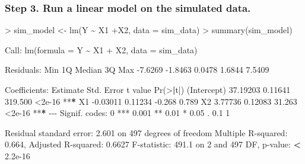 \documentclass[
]{article}
\newenvironment{Shaded}{\begin{snugshade}}{\end{snugshade}}
\newcommand{\AttributeTok}[1]{\textcolor[rgb]{0.77,0.63,0.00}{#1}}
\newcommand{\DecValTok}[1]{\textcolor[rgb]{0.00,0.00,0.81}{#1}}
\newcommand{\ErrorTok}[1]{\textcolor[rgb]{0.64,0.00,0.00}{\textbf{#1}}}
\newcommand{\FloatTok}[1]{\textcolor[rgb]{0.00,0.00,0.81}{#1}}
\newcommand{\FunctionTok}[1]{\textcolor[rgb]{0.00,0.00,0.00}{#1}}
\newcommand{\NormalTok}[1]{#1}
\newcommand{\OtherTok}[1]{\textcolor[rgb]{0.56,0.35,0.01}{#1}}
\newcommand{\SpecialCharTok}[1]{\textcolor[rgb]{0.00,0.00,0.00}{#1}}
\newcommand{\StringTok}[1]{\textcolor[rgb]{0.31,0.60,0.02}{#1}}
\begin{document}
\hypertarget{step-3.-run-a-linear-model-on-the-simulated-data.}{%
\subsubsection{Step 3. Run a linear model on the simulated
data.}\label{step-3.-run-a-linear-model-on-the-simulated-data.}}

\begin{Shaded}
\begin{Highlighting}[]
\SpecialCharTok{\textgreater{}}\NormalTok{ sim\_model }\OtherTok{\textless{}{-}} \FunctionTok{lm}\NormalTok{(Y }\SpecialCharTok{\textasciitilde{}}\NormalTok{ X1 }\SpecialCharTok{+}\NormalTok{X2, }\AttributeTok{data =}\NormalTok{ sim\_data)}
\SpecialCharTok{\textgreater{}} \FunctionTok{summary}\NormalTok{(sim\_model)}

\NormalTok{Call}\SpecialCharTok{:}
\FunctionTok{lm}\NormalTok{(}\AttributeTok{formula =}\NormalTok{ Y }\SpecialCharTok{\textasciitilde{}}\NormalTok{ X1 }\SpecialCharTok{+}\NormalTok{ X2, }\AttributeTok{data =}\NormalTok{ sim\_data)}

\NormalTok{Residuals}\SpecialCharTok{:}
\NormalTok{    Min      1Q  Median      3Q     Max }
\SpecialCharTok{{-}}\FloatTok{7.6269} \SpecialCharTok{{-}}\FloatTok{1.8463}  \FloatTok{0.0478}  \FloatTok{1.6844}  \FloatTok{7.5409} 

\NormalTok{Coefficients}\SpecialCharTok{:}
\NormalTok{            Estimate Std. Error t value }\FunctionTok{Pr}\NormalTok{(}\SpecialCharTok{\textgreater{}}\ErrorTok{|}\NormalTok{t}\SpecialCharTok{|}\NormalTok{)    }
\NormalTok{(Intercept) }\FloatTok{37.19203}    \FloatTok{0.11641} \FloatTok{319.500}   \SpecialCharTok{\textless{}}\FloatTok{2e{-}16} \SpecialCharTok{**}\ErrorTok{*}
\NormalTok{X1          }\SpecialCharTok{{-}}\FloatTok{0.03011}    \FloatTok{0.11234}  \SpecialCharTok{{-}}\FloatTok{0.268}    \FloatTok{0.789}    
\NormalTok{X2           }\FloatTok{3.77736}    \FloatTok{0.12083}  \FloatTok{31.263}   \SpecialCharTok{\textless{}}\FloatTok{2e{-}16} \SpecialCharTok{**}\ErrorTok{*}
\SpecialCharTok{{-}{-}{-}}
\NormalTok{Signif. codes}\SpecialCharTok{:}  \DecValTok{0} \StringTok{\textquotesingle{}***\textquotesingle{}} \FloatTok{0.001} \StringTok{\textquotesingle{}**\textquotesingle{}} \FloatTok{0.01} \StringTok{\textquotesingle{}*\textquotesingle{}} \FloatTok{0.05} \StringTok{\textquotesingle{}.\textquotesingle{}} \FloatTok{0.1} \StringTok{\textquotesingle{} \textquotesingle{}} \DecValTok{1}

\NormalTok{Residual standard error}\SpecialCharTok{:} \FloatTok{2.601}\NormalTok{ on }\DecValTok{497}\NormalTok{ degrees of freedom}
\NormalTok{Multiple R}\SpecialCharTok{{-}}\NormalTok{squared}\SpecialCharTok{:}  \FloatTok{0.664}\NormalTok{, Adjusted R}\SpecialCharTok{{-}}\NormalTok{squared}\SpecialCharTok{:}  \FloatTok{0.6627} 
\NormalTok{F}\SpecialCharTok{{-}}\NormalTok{statistic}\SpecialCharTok{:} \FloatTok{491.1}\NormalTok{ on }\DecValTok{2}\NormalTok{ and }\DecValTok{497}\NormalTok{ DF,  p}\SpecialCharTok{{-}}\NormalTok{value}\SpecialCharTok{:} \ErrorTok{\textless{}} \FloatTok{2.2e{-}16}
\end{Highlighting}
\end{Shaded}
\end{document}
